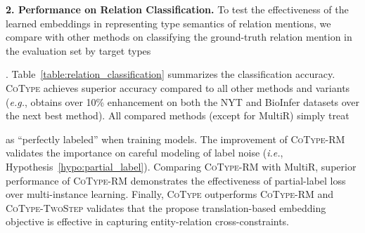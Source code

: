\documentclass[letterpaper]{sig-alternate-2013}
\def\ie{{\sl i.e.}}
\def\eg{{\sl e.g.}}
\begin{document}
\smallskip
\noindent
\textsf{\small\textbf{2. Performance on Relation Classification.}}
To test the effectiveness of the learned embeddings in representing type semantics of relation mentions,  we compare with other methods on classifying the ground-truth relation mention in the evaluation set by target types \begin{small}\end{small}. Table~\ref{table:relation_classification} summarizes the classification accuracy. \textsc{CoType} achieves superior accuracy compared to all other methods and variants (\eg, obtains over 10\% enhancement on both the NYT and BioInfer datasets over the next best method).
All compared methods (except for MultiR) simply treat \begin{small}\end{small} as ``perfectly labeled'' when training models. The improvement of \textsc{CoType-RM} validates the importance on careful modeling of label noise (\ie, Hypothesis~\ref{hypo:partial_label}). Comparing \textsc{CoType-RM} with MultiR, superior performance of \textsc{CoType-RM} demonstrates the effectiveness of partial-label loss over multi-instance learning. Finally, \textsc{CoType} outperforms \textsc{CoType-RM} and \textsc{CoType-TwoStep} validates that the propose translation-based embedding objective is effective in capturing entity-relation cross-constraints.
\end{document}
